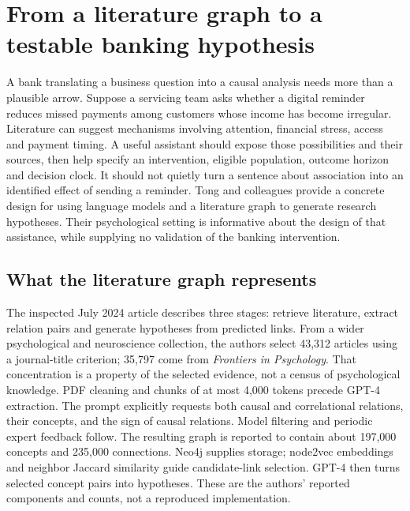 \section{From a literature graph to a testable banking hypothesis}
\label{exec20:hypothesis-scope}
A bank translating a business question into a causal analysis needs more than a plausible arrow. Suppose a servicing team asks whether a digital reminder reduces missed payments among customers whose income has become irregular. Literature can suggest mechanisms involving attention, financial stress, access and payment timing. A useful assistant should expose those possibilities and their sources, then help specify an intervention, eligible population, outcome horizon and decision clock. It should not quietly turn a sentence about association into an identified effect of sending a reminder. Tong and colleagues provide a concrete design for using language models and a literature graph to generate research hypotheses. Their psychological setting is informative about the design of that assistance, while supplying no validation of the banking intervention.\citep{exec20_hypothesis_generation}

\subsection{What the literature graph represents}
\label{exec20:hypothesis-claims}
The inspected July 2024 article describes three stages: retrieve literature, extract relation pairs and generate hypotheses from predicted links. From a wider psychological and neuroscience collection, the authors select 43,312 articles using a journal-title criterion; 35,797 come from \emph{Frontiers in Psychology}. That concentration is a property of the selected evidence, not a census of psychological knowledge. PDF cleaning and chunks of at most 4,000 tokens precede GPT-4 extraction. The prompt explicitly requests both causal and correlational relations, their concepts, and the sign of causal relations. Model filtering and periodic expert feedback follow. The resulting graph is reported to contain about 197,000 concepts and 235,000 connections. Neo4j supplies storage; node2vec embeddings and neighbor Jaccard similarity guide candidate-link selection. GPT-4 then turns selected concept pairs into hypotheses. These are the authors' reported components and counts, not a reproduced implementation.\citep{exec20_hypothesis_generation}


